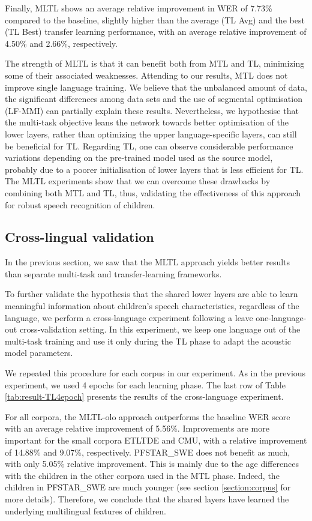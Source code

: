 Finally, \ac{MLTL} shows an average relative improvement in \ac{WER} of 7.73\%  compared to the baseline, slightly higher than the average (\ac{TL} Avg) and the best (\ac{TL} Best) transfer learning performance, with an average relative improvement of 4.50\% and 2.66\%, respectively. 

The strength of \ac{MLTL} is that it can benefit both from \ac{MTL} and \ac{TL}, minimizing some of their associated weaknesses.
Attending to our results, \ac{MTL} does not improve single language training. We believe that the unbalanced amount of data, the significant differences among data sets and the use of segmental optimisation (\ac{LF-MMI}) can partially explain these results. Nevertheless, we hypothesise that the multi-task objective leans the network towards 
better optimisation of the lower layers, rather than optimizing the upper language-specific layers, can still be beneficial for \ac{TL}.
Regarding \ac{TL}, one can observe considerable performance variations depending on the pre-trained model used as the source model, probably due to a poorer initialisation of lower layers that is less efficient for \ac{TL}. The \ac{MLTL} experiments show that we can overcome these drawbacks by combining both \ac{MTL} and \ac{TL}, thus, validating the effectiveness of this approach for robust speech recognition of children.


\subsection{Cross-lingual validation}
\label{section:olo}

In the previous section, we saw that the \ac{MLTL} approach yields better results than separate multi-task and transfer-learning frameworks.

To further validate the hypothesis that the shared lower layers are able to learn meaningful information about children's speech characteristics, regardless of the language, we perform a cross-language experiment following a leave one-language-out cross-validation setting. In this experiment, we keep one language out of the multi-task training and use it only during the \ac{TL} phase to adapt the acoustic model parameters. 

We repeated this procedure for each corpus in our experiment. As in the previous experiment, we used 4 epochs for each learning phase. The last row of Table \ref{tab:result-TL4epoch} presents the results of the cross-language experiment.

For all corpora, the \ac{MLTL-olo} approach outperforms the baseline \ac{WER} score with an average relative improvement of 5.56\%. Improvements are more important for the small corpora ETLTDE and CMU, with a  relative improvement of 14.88\% and 9.07\%, respectively. PFSTAR\_SWE does not benefit as much, with only 5.05\% relative improvement. This is mainly due to the age differences with the children in the other corpora used in the \ac{MTL} phase. Indeed, the children in PFSTAR\_SWE are much younger (see section  \ref{section:corpus} for more details). Therefore, we conclude that the shared layers have learned the underlying multilingual features of children.

